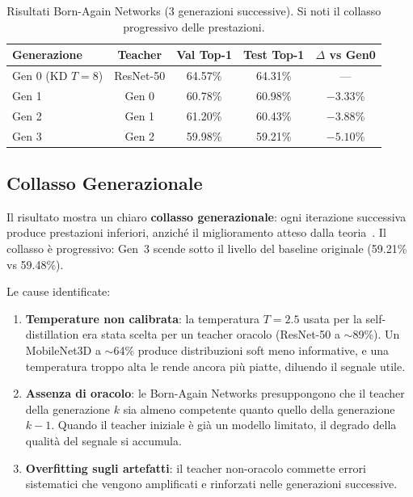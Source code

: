 \begin{table}[H]
\centering
\caption{Risultati Born-Again Networks (3 generazioni successive). Si noti il collasso progressivo delle prestazioni.}
\label{tab:born_again}
\begin{tabular}{lcccc}
\toprule
\textbf{Generazione} & \textbf{Teacher} & \textbf{Val Top-1} & \textbf{Test Top-1} & \textbf{$\Delta$ vs Gen0} \\
\midrule
Gen 0 (KD $T=8$) & ResNet-50 & 64.57\% & 64.31\% & --- \\
Gen 1              & Gen 0     & 60.78\% & 60.98\% & $-3.33$\% \\
Gen 2              & Gen 1     & 61.20\% & 60.43\% & $-3.88$\% \\
Gen 3              & Gen 2     & 59.98\% & 59.21\% & $-5.10$\% \\
\bottomrule
\end{tabular}
\end{table}

\subsection{Collasso Generazionale}

Il risultato mostra un chiaro \textbf{collasso generazionale}: ogni iterazione successiva produce prestazioni inferiori, anziché il miglioramento atteso dalla teoria~\cite{furlanello2018born}. Il collasso è progressivo: Gen~3 scende sotto il livello del baseline originale (59.21\% vs 59.48\%).

Le cause identificate:

\begin{enumerate}
    \item \textbf{Temperature non calibrata}: la temperatura $T = 2.5$ usata per la self-distillation era stata scelta per un teacher oracolo (ResNet-50 a $\sim$89\%). Un MobileNet3D a $\sim$64\% produce distribuzioni soft meno informative, e una temperatura troppo alta le rende ancora più piatte, diluendo il segnale utile.
    
    \item \textbf{Assenza di oracolo}: le Born-Again Networks presuppongono che il teacher della generazione $k$ sia almeno competente quanto quello della generazione $k-1$. Quando il teacher iniziale è già un modello limitato, il degrado della qualità del segnale si accumula.
    
    \item \textbf{Overfitting sugli artefatti}: il teacher non-oracolo commette errori sistematici che vengono amplificati e rinforzati nelle generazioni successive.
\end{enumerate}

